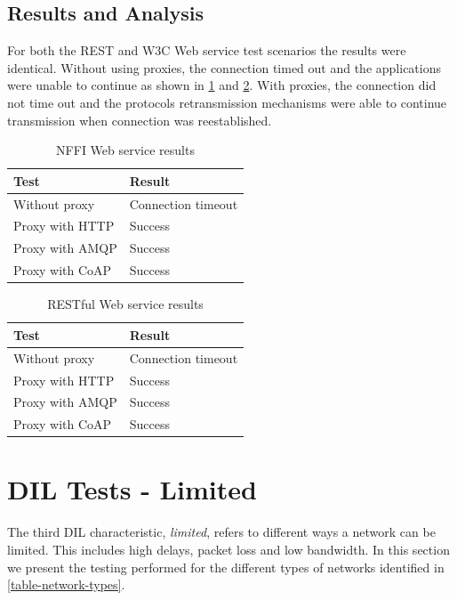 \subsection{Results and Analysis}

For both the REST and W3C Web service test scenarios the results were identical.
Without using proxies, the connection timed out and the applications were unable
to continue as shown in \cref{table:disconnected-nffi} and
\cref{table:disconnected-rest}. With proxies, the connection did not time out
and the protocols retransmission mechanisms were able to continue transmission
when connection was reestablished.


\begin{table}[h!]
\begin{tabular}{| l | l |}
\hline
  \textbf{Test} & \textbf{Result} \\ \hline
  Without proxy & Connection timeout \\ \hline
  Proxy with HTTP & Success \\ \hline
  Proxy with AMQP & Success \\ \hline
  Proxy with CoAP & Success \\ \hline
\end{tabular}
\caption{NFFI Web service results}
\label{table:disconnected-nffi}
\end{table}

\begin{table}[h!]
\begin{tabular}{| l | l |}
\hline
  \textbf{Test} & \textbf{Result} \\ \hline
  Without proxy & Connection timeout \\ \hline
  Proxy with HTTP & Success \\ \hline
  Proxy with AMQP & Success \\ \hline
  Proxy with CoAP & Success \\ \hline
\end{tabular}
\caption{RESTful Web service results}
\label{table:disconnected-rest}
\end{table}


\section{DIL Tests - Limited}

The third DIL characteristic, \textit{limited}, refers to different ways a
network can be limited. This includes high delays, packet loss and low
bandwidth. In this section we present the testing performed for the different
types of networks identified in \cref{table-network-types}.




